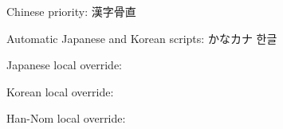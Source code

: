 \documentclass{article}
\begin{document}
Chinese priority: 漢字骨直

Automatic Japanese and Korean scripts: かなカナ 한글

Japanese local override: 

Korean local override: 

Han-Nom local override: 
\end{document}
